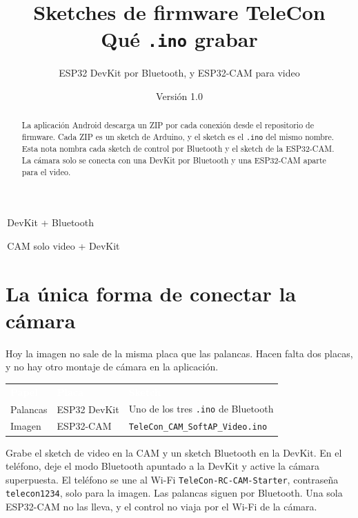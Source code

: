 \documentclass[12pt,a4paper]{article}
\title{Sketches de firmware TeleCon\\[0.3em]
\large Qué \texttt{.ino} grabar}
\author{ESP32 DevKit por Bluetooth, y ESP32-CAM para video}
\date{Versión 1.0 \quad 2026}
\newcommand{\thc}[1]{\textcolor{white}{\bfseries #1}}
\newcommand{\chip}[2]{\colorbox{#1}{\strut\,\scriptsize #2\,}}
\begin{document}
\maketitle

\begin{abstract}
La aplicación Android descarga un ZIP por cada conexión desde el
repositorio de firmware. Cada ZIP es un sketch de Arduino, y el sketch es
el \texttt{.ino} del mismo nombre. Esta nota nombra cada sketch de control
por Bluetooth y el sketch de la ESP32-CAM. La cámara solo se conecta con
una DevKit por Bluetooth y una ESP32-CAM aparte para el video.
\end{abstract}

{\sffamily\scriptsize
\chip{TblChan}{DevKit + Bluetooth}
\chip{TblTelem}{CAM solo video + DevKit}}

\tableofcontents
\vspace{1em}

\section{La única forma de conectar la cámara}

Hoy la imagen no sale de la misma placa que las palancas. Hacen falta
dos placas, y no hay otro montaje de cámara en la aplicación.

\begin{center}
\renewcommand{\arraystretch}{1.28}
\setlength{\tabcolsep}{5pt}
\begin{tabular}{>{\raggedright\arraybackslash}p{3.6cm}
                >{\raggedright\arraybackslash}p{5.4cm}
                >{\raggedright\arraybackslash}p{5.2cm}}
\rowcolor{TblHead}
\thc{Papel} & \thc{Placa} & \thc{Sketch} \\
\rowcolor{TblChan}
Palancas & ESP32 DevKit & Uno de los tres \texttt{.ino} de Bluetooth \\
\rowcolor{TblTelem}
Imagen & ESP32-CAM & \texttt{TeleCon\_CAM\_\-SoftAP\_Video.ino} \\
\end{tabular}
\end{center}

Grabe el sketch de video en la CAM y un sketch Bluetooth en la DevKit.
En el teléfono, deje el modo Bluetooth apuntado a la DevKit y active la
cámara superpuesta. El teléfono se une al Wi-Fi
\texttt{TeleCon-RC-CAM-Starter}, contraseña \texttt{telecon1234}, solo
para la imagen. Las palancas siguen por Bluetooth. Una sola ESP32-CAM
no las lleva, y el control no viaja por el Wi-Fi de la cámara.
\end{document}
